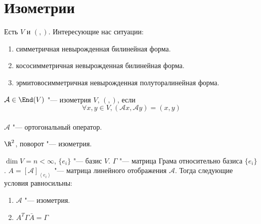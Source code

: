 \section{Изометрии}
Есть $V$ и $(,)$.
Интересующие нас ситуации:
\begin{enumerate}
    \item симметричная невырожденная билинейная форма.
    \item кососимметричная невырожденная билинейная форма.
    \item эрмитовосимметричная невырожденная полуторалинейная форма.
\end{enumerate}

\begin{Def}
	$\mathcal A \in \End(V)$ "--- изометрия $V$, $(,)$, если
	\[ \forall x, y \in V, (\mathcal A x, \mathcal A y) = (x, y) \] \\
	$\mathcal A$ "--- ортогональный оператор.
\end{Def}

\begin{exmp}
	$\R^2$, поворот "--- изометрия.
\end{exmp}

\begin{theorem}
	$\dim V = n < \infty$, $\{e_i\} $ "--- базис $V$.
	$\Gamma$ "--- матрица Грама относительно базиса $\{e_i\}$.
	$A = [\mathcal A]_{\left<e_i\right>}$ "--- матрица линейного отображения $\mathcal A$.
	Тогда следующие условия равносильны:
	\begin{enumerate}
		\item $\mathcal A $ "--- изометрия.
		\item $A^T \Gamma \bar A = \Gamma$
	\end{enumerate}
\end{theorem}

